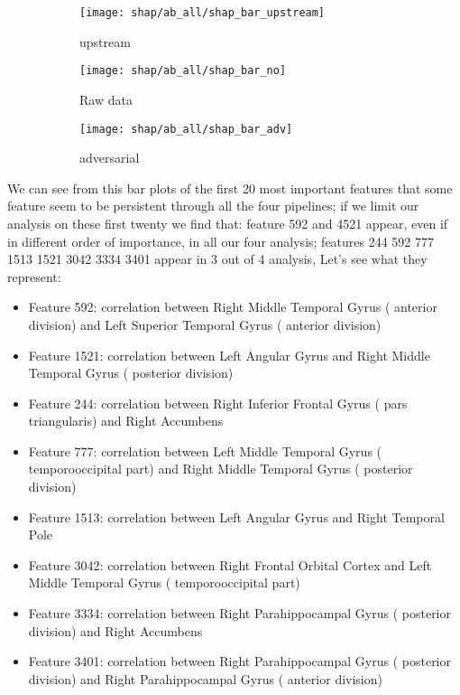 \documentclass[11pt]{report}
\begin{document}
\begin{figure}
\centering
\begin{subfigure}[b]{.45\textwidth}
   \texttt{[image: shap/ab\_all/shap\_bar\_upstream]}
   \caption{upstream}
   \label{}
\end{subfigure}
\begin{subfigure}[b]{.45\textwidth}
   \texttt{[image: shap/ab\_all/shap\_bar\_no]}
   \caption{Raw data}
   \label{}
\end{subfigure}
\begin{subfigure}[b]{.45\textwidth}
   \texttt{[image: shap/ab\_all/shap\_bar\_adv]}
   \caption{adversarial}
   \label{}
\end{subfigure}
\caption{}
\label{fig:shap_abide_all}
\end{figure}


We can see from this bar plots of the first 20 most important features that some feature seem to be persistent through all the four pipelines; if we limit our analysis on these first twenty we find that: feature 592 and 4521 appear, even if in different order of importance, in all our four analysis; features 244 592 777 1513 1521 3042 3334 3401 appear in 3 out of 4 analysis,
Let's see what they represent:
\begin{itemize}
\item Feature 592: correlation between Right Middle Temporal Gyrus ( anterior division) and Left Superior Temporal Gyrus ( anterior division)
\item Feature 1521: correlation between Left Angular Gyrus  and Right Middle Temporal Gyrus ( posterior division)

\item Feature 244: correlation between Right Inferior Frontal Gyrus ( pars triangularis) and Right Accumbens
\item Feature 777: correlation between Left Middle Temporal Gyrus ( temporooccipital part) and Right Middle Temporal Gyrus ( posterior division)
\item Feature 1513: correlation between Left Angular Gyrus  and Right Temporal Pole
\item Feature 3042: correlation between Right Frontal Orbital Cortex  and Left Middle Temporal Gyrus ( temporooccipital part)
\item Feature 3334: correlation between Right Parahippocampal Gyrus ( posterior division) and Right Accumbens
\item Feature 3401: correlation between Right Parahippocampal Gyrus ( posterior division) and Right Parahippocampal Gyrus ( anterior division)
\end{itemize}
\end{document}
